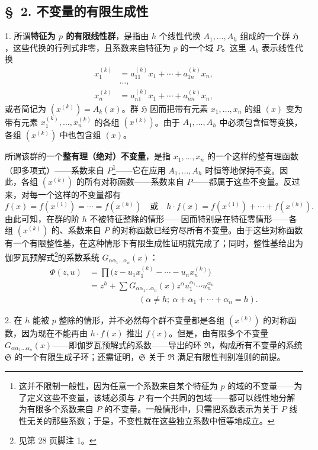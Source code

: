\documentclass[11pt]{article}
\newcommand{\srcemph}[1]{\textbf{#1}}
\begin{document}
\subsection*{\S\ 2. 不变量的有限生成性}

1. 所谓\srcemph{特征为 $p$ 的有限线性群}，是指由 $h$ 个线性代换 $A_1,\ldots,A_h$ 组成的一个群 $\mathfrak H$，这些代换的行列式非零，且系数来自特征为 $p$ 的一个域 $P$。这里 $A_k$ 表示线性代换
\[
\begin{aligned}
 x_1^{(k)}&=a_{11}^{(k)}x_1+\cdots+a_{1n}^{(k)}x_n,\\[-0.2em]
 &\ldots,\\[-0.2em]
 x_n^{(k)}&=a_{n1}^{(k)}x_1+\cdots+a_{nn}^{(k)}x_n,
\end{aligned}
\]
或者简记为 $(x^{(k)})=A_k(x)$。群 $\mathfrak H$ 因而把带有元素 $x_1,\ldots,x_n$ 的组 $(x)$ 变为带有元素 $x_1^{(k)},\ldots,x_n^{(k)}$ 的各组 $(x^{(k)})$。由于 $A_1,\ldots,A_h$ 中必须包含恒等变换，各组 $(x^{(k)})$ 中也包含组 $(x)$。

所谓该群的一个\srcemph{整有理（绝对）不变量}，是指 $x_1,\ldots,x_n$ 的一个这样的整有理函数（即多项式）——系数来自 $P$\footnote{这并不限制一般性，因为任意一个系数来自某个特征为 $p$ 的域的不变量——为了定义这些不变量，该域必须与 $P$ 有一个共同的包域——都可以线性地分解为有限多个系数来自 $P$ 的不变量。一般情形中，只需把系数表示为关于 $P$ 线性无关的那些系数；于是，不变性就在这些独立系数中恒等地成立。}——它在应用 $A_1,\ldots,A_h$ 时恒等地保持不变。因此，各组 $(x^{(k)})$ 的所有对称函数——系数来自 $P$——都属于这些不变量。反过来，对每一个这样的不变量都有
\[
 f(x)=f(x^{(1)})=\cdots=f(x^{(h)})
 \quad\text{或}\quad
 h\cdot f(x)=f(x^{(1)})+\cdots+f(x^{(h)}).
\]
由此可知，在群的阶 $h$ 不被特征整除的情形——因而特别是在特征零情形——各组 $(x^{(k)})$ 的、系数来自 $P$ 的对称函数已经穷尽所有不变量。由于这些对称函数有一个有限整性基，在这种情形下有限生成性证明就完成了；同时，整性基给出为伽罗瓦预解式\footnote{见第 28 页脚注 1。}的系数系统 $G_{\alpha\alpha_1\ldots\alpha_n}(x)$：
\[
\begin{aligned}
\Phi(z,u)&=\prod\bigl(z-u_1x_1^{(k)}-\cdots-u_nx_n^{(k)}\bigr)\\
&=z^h+\sum G_{\alpha\alpha_1\ldots\alpha_n}(x)
 z^{\alpha}u_1^{\alpha_1}\cdots u_n^{\alpha_n}\\
&\hspace{6em}(\alpha\ne h;\ \alpha+\alpha_1+\cdots+\alpha_n=h).
\end{aligned}
\]

2. 在 $h$ 能被 $p$ 整除的情形，并不必然每个群不变量都是各组 $(x^{(k)})$ 的对称函数，因为现在不能再由 $h\cdot f(x)$ 推出 $f(x)$。但是，由有限多个不变量 $G_{\alpha\alpha_1\ldots\alpha_n}(x)$——即伽罗瓦预解式的系数——导出的环 $\mathfrak R$，构成所有不变量的系统 $\mathfrak S$ 的一个有限生成子环；还需证明，$\mathfrak S$ 关于 $\mathfrak R$ 满足有限性判别准则的前提。
\end{document}
